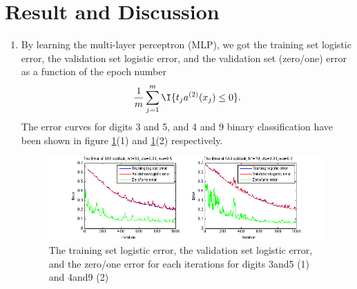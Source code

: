 \section{Result and Discussion}
\begin{enumerate}
\item By learning the multi-layer perceptron (MLP), we got the training set logistic error, the validation set logistic error, and the validation set (zero/one) error as a function of the epoch number
\begin{align}
\frac{1}{m}\sum_{j=1}^{m} \I{t_{j} a^{(2)}(x_j)\le{0}}. 
\end{align}
The error curves for digits 3 and 5, and 4 and 9 binary classification have been shown in figure \ref{fig:3error}(1) and \ref{fig:3error}(2) respectively.

	\begin{figure}[htbp]
		\centering
		\includegraphics[width=0.99\textwidth]{plots/3error.png}
		\caption{The training set logistic error, the validation set logistic error, and the zero/one error for each iterations for digits 3and5 (1) and 4and9 (2)}
		\label{fig:3error}
	\end{figure}
	

\end{enumerate}
